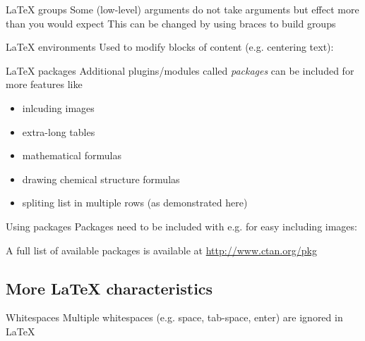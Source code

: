 \begin{frame}
	\begin{block}{{\LaTeX} groups}
		Some (low-level) arguments do not take arguments but effect more than
		you would expect
		This can be changed by using braces to build groups
	\end{block}
\end{frame}
\begin{frame}
	\begin{block}{{\LaTeX} environments}
		Used to modify blocks of content (e.g. centering text):
	\end{block}
\end{frame}
\begin{frame}
	\begin{block}{{\LaTeX} packages}
		Additional plugins/modules called \emph{packages} can be included for
		more features like
		\begin{multicols}{2}
			\begin{itemize}
				\item inlcuding images
				\item extra-long tables
				\item mathematical formulas
				\item drawing chemical structure formulas
				\item spliting list in multiple rows (as demonstrated here)
			\end{itemize}
		\end{multicols}
	\end{block}

	\begin{block}{Using packages}
		Packages need to be included with
		e.g. for easy including images:
	\end{block}

	A full list of available packages is available at
	\url{http://www.ctan.org/pkg}
\end{frame}

\subsection{More {\LaTeX} characteristics}
\begin{frame}
	\begin{block}{Whitespaces}
		Multiple whitespaces (e.g. space, tab-space, enter) are ignored in
		\LaTeX{}
	\end{block}
\end{frame}

